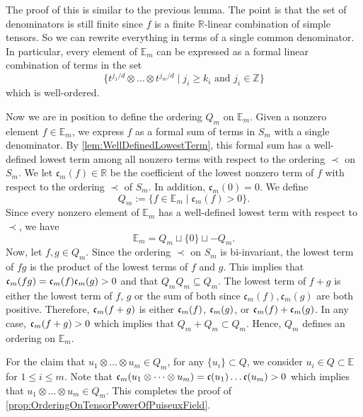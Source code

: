 \documentclass{amsart}
\makeatletter
\renewenvironment{proof}[1][\proofname]{%
   \par\pushQED{\qed}\normalfont%
   \topsep6\p@\@plus6\p@\relax
   \trivlist\item[\hskip\labelsep\bfseries#1\@addpunct{.}]%
   \ignorespaces
}{%
   \popQED\endtrivlist\@endpefalse
}
\makeatother
\begin{document}
\begin{proof}[Proof of \cref{prop:OrderingOnTensorPowerOfPuiseuxField}]
    \begin{proof}
        The proof of this is similar to the previous lemma. The point is that the set of denominators is still finite since $f$ is a finite $\mathbb{R}$-linear combination of simple tensors. So we can rewrite everything in terms of a single common denominator. In particular, every element of $\mathbb{E}_m$ can be expressed as a formal linear combination of terms in the set 
        \[
        \{ t^{j_1/d} \otimes \dots \otimes t^{j_m/d} \mid j_i \geq k_i \text{ and } j_i \in \mathbb{Z}\}
        \] 
        which is well-ordered. 
    \end{proof}

    Now we are in position to define the ordering $Q_m$ on $\mathbb{E}_m$. Given a nonzero element $f\in \mathbb{E}_m$, we express $f$ as a formal sum of terms in $S_m$ with a single denominator. By \cref{lem:WellDefinedLowestTerm}, this formal sum has a well-defined lowest term among all nonzero terms with respect to the ordering $\prec $ on $S_m$. We let $\mathfrak{c}_m(f) \in \mathbb{R}$ be the coefficient of the lowest nonzero term of $f$ with respect to the ordering $\prec$ of $S_m$. In addition, $\mathfrak{c}_m(0)= 0$. We define
    \[
    Q_m := \{f \in \mathbb{E}_m \mid \mathfrak{c}_m(f) > 0 \}. 
    \]
    Since every nonzero element of $\mathbb{E}_m$ has a well-defined lowest term with respect to $\prec$, we have 
    \[\mathbb{E}_m = Q_m \sqcup\{0\} \sqcup -Q_m.\] 
    Now, let $f,g \in Q_m$. Since the ordering $\prec$ on $S_m$ is bi-invariant, the lowest term of $fg$ is the product of the lowest terms of $f$ and $g$. This implies that $\frak{c}_m(fg) = \frak{c}_m(f)\frak{c}_m(g) >0$ and that $Q_m Q_m \subseteq Q_m$. The lowest term of $f+g$ is either the lowest term of $f$, $g$ or the sum of both since $\mathfrak{c}_m(f), \mathfrak{c}_m(g)$ are both positive. Therefore, $\frak{c}_m(f+g)$ is either $\frak{c}_m(f)$, $\frak{c}_m(g)$, or $\frak{c}_m(f)+\frak{c}_m(g)$. In any case, $\frak{c}_m(f+g) >0$ which implies that $Q_m + Q_m \subset Q_m$. Hence, $Q_m$ defines an ordering on $\mathbb{E}_m$. 

    For the claim that $u_1\otimes \dots \otimes u_m \in  Q_m$, for any $ \{u_i\}\subset Q$, we consider $u_i \in Q \subset \mathbb{E}$ for $1\leq i \leq m$. Note that $\mathfrak{c}_m(u_1\otimes \dots \otimes u_m) = \frak{c}(u_1)\dots\frak{c}(u_m) >0$ which implies that $u_1\otimes \dots \otimes u_m \in Q_m$. This completes the proof of \cref{prop:OrderingOnTensorPowerOfPuiseuxField}.
\end{proof}
\end{document}
